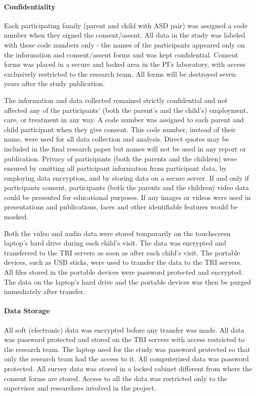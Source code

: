 \documentclass{ut-thesis}
\begin{document}
\paragraph{Confidentiality}
Each participating family (parent and child with ASD pair) was assigned a code number when they signed the consent/assent. All data in the study was labeled with these code numbers only - the names of the participants appeared only on the information and consent/assent forms and was kept confidential. Consent forms was placed in a secure and locked area in the PI's laboratory, with access exclusively restricted to the research team. All forms will be destroyed seven years after the study publication. 

The information and data collected remained strictly confidential and not affected any of the participants' (both the parent's and the child's) employment, care, or treatment in any way. A code number was assigned to each parent and child participant when they give consent. This code number, instead of their name, were used for all data collection and analysis. Direct quotes may be included in the final research paper but names will not be used in any report or publication. Privacy of participants (both the parents and the children) were ensured by omitting all participant information from participant data, by employing data encryption, and by storing data on a secure server.  If and only if participants consent, participants (both the parents and the children) video data could be presented for educational purposes.  If any images or videos were used in presentations and publications, faces and other identifiable features would be masked.

Both the video and audio data were stored temporarily on the touchscreen laptop's hard drive during each child's visit. The data was encrypted and transferred to the TRI servers as soon as after each child's visit. The portable devices, such as USB sticks, were used to transfer the data to the TRI servers. All files stored in the portable devices were password protected and encrypted. The data on the laptop's hard drive and the portable devices was then be purged immediately after transfer. 

\paragraph{Data Storage}
All soft (electronic) data was encrypted before any transfer was made. All data was password protected and stored on the TRI servers with access restricted to the research team. The laptop used for the study was password protected so that only the research team had the access to it. All computerized data was password protected. All survey data was stored in a locked cabinet different from where the consent forms are stored. Access to all the data was restricted only to the supervisor and researchers involved in the project. 
\end{document}
